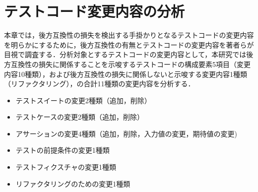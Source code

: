 \documentclass[submit]{ipsj}
\begin{document}



\section{テストコード変更内容の分析}\label{sec:contentAnalysis}

本章では，後方互換性の損失を検出する手掛かりとなるテストコードの変更内容を明らかにするために，後方互換性の有無とテストコードの変更内容を著者らが目視で調査する．分析対象とするテストコードの変更内容として，本研究では後方互換性の損失に関係することを示唆するテストコードの構成要素5項目（変更内容10種類），および後方互換性の損失に関係しないと示唆する変更内容1種類（リファクタリング），の合計11種類の変更内容を分析する．

\begin{itemize}
  \item テストスイートの変更2種類（追加，削除）
  \item テストケースの変更2種類（追加，削除）
  \item アサーションの変更4種類（追加，削除，入力値の変更，期待値の変更)
  \item テストの前提条件の変更1種類
  \item テストフィクスチャの変更1種類
  \item リファクタリングのための変更1種類  
\end{itemize}
\vspace{-4mm}
\end{document}

